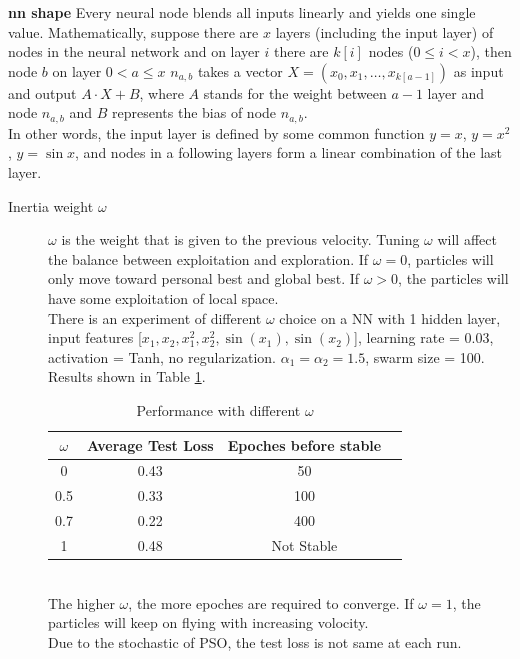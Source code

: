 \documentclass[12pt]{article}
\begin{document}
\noindent \textbf{nn shape} Every neural node blends all inputs linearly and yields one single value. Mathematically, suppose there are $x$ layers (including the input layer) of nodes in the neural network and on layer $i$ there are $k[i]$ nodes ($0\leq i<x$), then node $b$ on layer $0<a\leq x$ $n_{a,b}$ takes a vector 
$X=(x_0,x_1,\ldots,x_{k[a-1]})$ as input and output $A\cdot X+B$, where $A$ stands for the weight between $a-1$ layer and node $n_{a,b}$ and $B$ represents the bias of node $n_{a,b}$.\\
In other words, the input layer is defined by some common function $y=x$, $y=x^2$, $y=\sin x$, and nodes in a following layers form a linear combination of the last layer.
    
      
\begin{description}
\item[Inertia weight $\omega$]  $\omega$ is the weight that is given to the previous velocity. Tuning $\omega$ will affect the balance between exploitation and exploration. If $\omega = 0$, particles will only move toward personal best and global best. If $\omega > 0$, the particles will have some exploitation of local space. \\
There is an experiment of different $\omega$ choice on a NN with 1 hidden layer, input features [$x_1,x_2,x_1^2,x_2^2,\sin(x_1),\sin(x_2)$], learning rate = 0.03, activation = Tanh, no regularization. $\alpha_1=\alpha_2 = 1.5$, swarm size = 100.
Results shown in Table \ref{t_omega}.
\begin{table}[!ht]
\centering
\begin{tabular}{@{}cccc@{}}
\toprule
$\omega$ & Average Test Loss & Epoches before stable \\ \midrule
0 & 0.43 & 50  \\
0.5 & 0.33  &  100  \\
0.7 & 0.22  &   400 \\
1  & 0.48  & Not Stable  \\
\bottomrule
\end{tabular}
\caption{Performance with different $\omega$}
\label{t_omega}
\end{table}
\\
The higher $\omega$, the more epoches are required to converge. If $\omega = 1$, the particles will keep on flying with increasing volocity.\\
Due to the stochastic of PSO, the test loss is not same at each run. 
\end{description}
\end{document}

